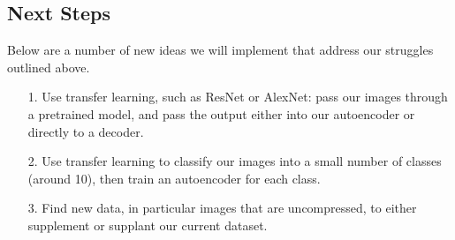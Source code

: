 \documentclass{article} %
\begin{document}
\subsection{Next Steps}
\label{next_steps}

Below are a number of new ideas we will implement that address our struggles outlined above.

\begin{itemize}
    \item[1.] Use transfer learning, such as ResNet or AlexNet: pass our images through a pretrained model, and pass the output either into our autoencoder or directly to a decoder.
    \item[2.] Use transfer learning to classify our images into a small number of classes (around 10), then train an autoencoder for each class. 
    \item[3.] Find new data, in particular images that are uncompressed, to either supplement or supplant our current dataset.
\end{itemize}

\label{last_page}



\end{document}
